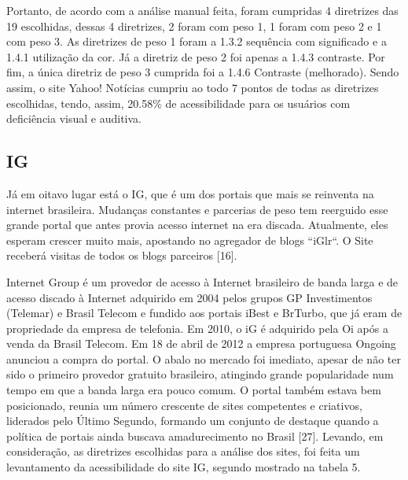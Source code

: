 \documentclass[a4paper]{article}
\begin{document}
\begin{titlepage}
Portanto, de acordo com a análise manual feita, foram cumpridas 4 diretrizes das 19 escolhidas, dessas 4 diretrizes, 2 foram com peso 1, 1 foram com peso 2 e 1 com peso 3. As diretrizes de peso 1 foram a 1.3.2 sequência com significado e a 1.4.1 utilização da cor. Já a diretriz de peso 2 foi apenas a 1.4.3 contraste. Por fim, a única diretriz de peso 3 cumprida foi a 1.4.6 Contraste (melhorado). Sendo assim, o site Yahoo! Notícias cumpriu ao todo 7 pontos de todas as diretrizes escolhidas, tendo, assim, 20.58\% de acessibilidade para os usuários com deficiência visual e auditiva.

\subsection{IG}

Já em oitavo lugar está o IG, que é um dos portais que mais se reinventa na internet brasileira. Mudanças constantes e parcerias de peso tem reerguido esse grande portal que antes provia acesso internet na era discada. Atualmente, eles esperam crescer muito mais, apostando no agregador de blogs “iGlr“. O Site receberá visitas de todos os blogs parceiros [16].

Internet Group é um provedor de acesso à Internet brasileiro de banda larga e de acesso discado à Internet adquirido em 2004  pelos grupos GP Investimentos (Telemar) e Brasil Telecom e fundido aos portais iBest e BrTurbo, que já eram de propriedade da empresa de telefonia. Em 2010, o iG é adquirido pela Oi após a venda da Brasil Telecom. Em 18 de abril de 2012 a empresa portuguesa Ongoing anunciou a compra do portal. O abalo no mercado foi imediato, apesar de não ter sido o primeiro provedor gratuito brasileiro, atingindo grande popularidade num tempo em que a banda larga era pouco comum. O portal também estava bem posicionado, reunia um número crescente de sites competentes e criativos, liderados pelo Último Segundo, formando um conjunto de destaque quando a política de portais ainda buscava amadurecimento no Brasil [27]. Levando, em consideração, as diretrizes escolhidas para a análise dos sites, foi feita um levantamento da acessibilidade do site IG, segundo mostrado na tabela 5.\\


\end{titlepage}
\end{document}
